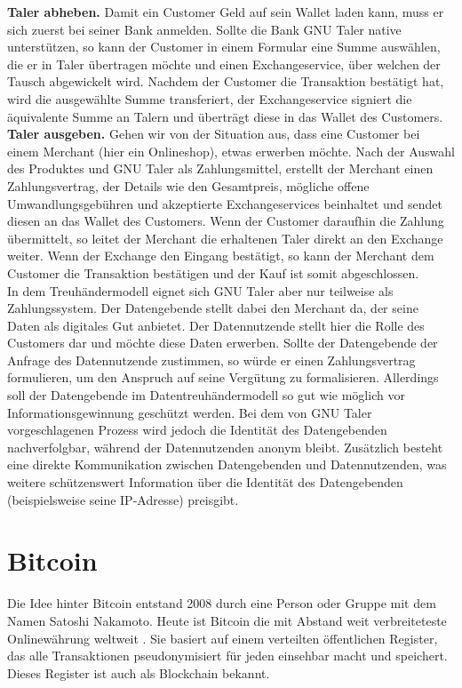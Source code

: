 \documentclass{scrreprt}
\begin{document}
\textbf{Taler abheben.} Damit ein Customer Geld auf sein Wallet laden kann, muss er sich zuerst bei seiner Bank anmelden. Sollte die Bank GNU Taler native unterstützen, so kann der Customer in einem Formular eine Summe auswählen, die er in Taler übertragen möchte und einen Exchangeservice, über welchen der Tausch abgewickelt wird. Nachdem der Customer die Transaktion bestätigt hat, wird die ausgewählte Summe transferiert, der Exchangeservice signiert die äquivalente Summe an Talern und überträgt diese in das Wallet des Customers.\\

\textbf{Taler ausgeben.} Gehen wir von der Situation aus, dass eine Customer bei einem Merchant (hier ein Onlineshop), etwas erwerben möchte. Nach der Auswahl des Produktes und GNU Taler als Zahlungsmittel, erstellt der Merchant einen Zahlungsvertrag, der Details wie den Gesamtpreis, mögliche offene Umwandlungsgebühren und akzeptierte Exchangeservices beinhaltet und sendet diesen an das Wallet des Customers.  Wenn der Customer daraufhin die Zahlung übermittelt, so leitet der Merchant die erhaltenen Taler direkt an den Exchange weiter. Wenn der Exchange den Eingang bestätigt, so kann der Merchant dem Customer die Transaktion bestätigen und der Kauf ist somit abgeschlossen.\\


In dem Treuhändermodell eignet sich GNU Taler aber nur teilweise als Zahlungssystem. Der Datengebende stellt dabei den Merchant da, der seine Daten als digitales Gut anbietet. Der Datennutzende stellt hier die Rolle des Customers dar und möchte diese Daten erwerben. Sollte der Datengebende der Anfrage des Datennutzende zustimmen, so würde er einen Zahlungsvertrag formulieren, um den Anspruch auf seine Vergütung zu formalisieren. Allerdings soll der Datengebende im Datentreuhändermodell so gut wie möglich vor Informationsgewinnung geschützt werden. Bei dem von GNU Taler vorgeschlagenen Prozess wird jedoch die Identität des Datengebenden nachverfolgbar, während der Datennutzenden anonym bleibt. Zusätzlich besteht eine direkte Kommunikation zwischen Datengebenden und Datennutzenden, was weitere schützenswert Information über die Identität des Datengebenden (beispielsweise seine IP-Adresse) preisgibt.

\section{Bitcoin}
\label{sec:bitcoin}
Die Idee hinter Bitcoin entstand 2008 durch eine Person oder Gruppe mit dem Namen Satoshi Nakamoto. Heute ist Bitcoin die mit Abstand weit verbreiteteste Onlinewährung weltweit \cite{btc-beginnerGuide}. Sie basiert auf einem verteilten öffentlichen Register, das alle Transaktionen pseudonymisiert für jeden einsehbar macht und speichert. Dieses Register ist auch als Blockchain bekannt.
\end{document}
